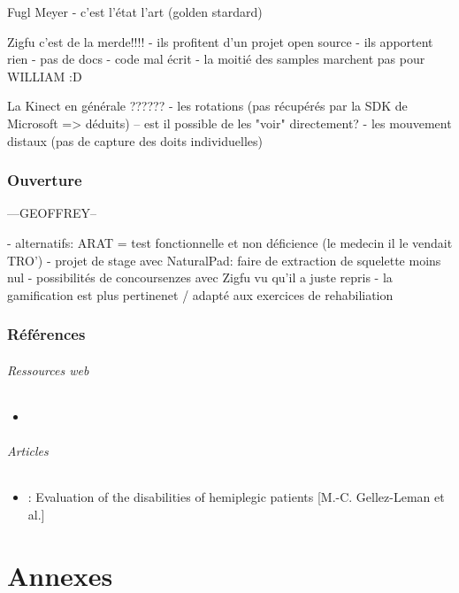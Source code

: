 \documentclass[french,12pt]{report}
\begin{document}
		Fugl Meyer
		- c'est l'état l'art (golden stardard)
		
		Zigfu c'est de la merde!!!!
		- ils profitent d'un projet open source
		- ils apportent rien
		- pas de docs
		- code mal écrit
		- la moitié des samples marchent pas pour WILLIAM :D
		
		La Kinect en générale ??????
		- les rotations (pas récupérés par la SDK de Microsoft => déduits)
		  -- est il possible de les "voir" directement?
		- les mouvement distaux (pas de capture des doits individuelles)
		
		\section{Ouverture}		---GEOFFREY--
		
		- alternatifs: ARAT = test fonctionnelle et non déficience (le medecin il le vendait TRO')
		- projet de stage avec NaturalPad: faire de extraction de squelette moins nul
		- possibilités de concoursenzes avec Zigfu vu qu'il a juste repris 
		- la gamification est plus pertinenet / adapté aux exercices de rehabiliation 
		
		\section{Références}
			\paragraph{Ressources web}
				\begin{itemize}
					\item 
				\end{itemize}
			\paragraph{Articles}
				\begin {itemize}
					\item : Evaluation of the disabilities of hemiplegic patients [M.-C. Gellez-Leman et al.] \label{ref_analyse_litterature}
				\end{itemize}
\part{Annexes}
\end{document}
